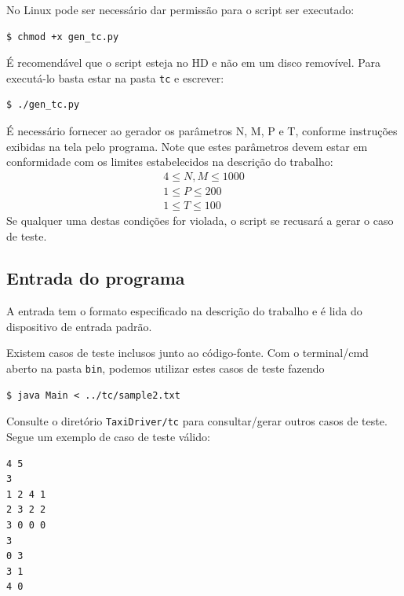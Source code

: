 \documentclass[a4paper,landscape,12pt]{article}
\begin{document}
No Linux pode ser necessário dar permissão para o script ser executado:
\begin{verbatim}
$ chmod +x gen_tc.py
\end{verbatim}
É recomendável que o script esteja no HD e não em um disco removível. Para executá-lo basta estar na pasta \texttt{tc} e escrever:
\begin{verbatim}
$ ./gen_tc.py
\end{verbatim}
É necessário fornecer ao gerador os parâmetros N, M, P e T, conforme instruções exibidas na tela pelo programa. Note que estes parâmetros devem estar em conformidade com os limites estabelecidos na descrição do trabalho:
\begin{gather*}
4 \leq N, M \leq 1000 \\
1 \leq P \leq 200 \\
1 \leq T \leq 100
\end{gather*}
Se qualquer uma destas condições for violada, o script se recusará a gerar o caso de teste.

\subsection{Entrada do programa}
A entrada tem o formato especificado na descrição do trabalho e é lida do dispositivo de entrada padrão.

Existem casos de teste inclusos junto ao código-fonte. Com o terminal/cmd aber\-to na pasta \texttt{bin}, podemos utilizar estes casos de teste fazendo
\begin{verbatim}
$ java Main < ../tc/sample2.txt
\end{verbatim}
Consulte o diretório \texttt{TaxiDriver/tc} para consultar/gerar outros casos de teste. Segue um exemplo de caso de teste válido:
\begin{verbatim}
4 5
3
1 2 4 1
2 3 2 2
3 0 0 0
3
0 3
3 1
4 0
\end{verbatim}
\end{document}
